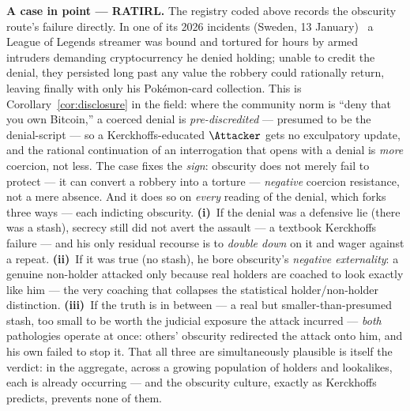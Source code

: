 \medskip\noindent\textbf{A case in point --- RATIRL.} The registry coded above records
the obscurity route's failure directly. In one of its 2026 incidents (Sweden, 13
January)~\cite{ratirl} a League of Legends streamer was bound and tortured for hours by
armed intruders demanding cryptocurrency he denied holding; unable to credit the
denial, they persisted long past any value the robbery could rationally return,
leaving finally with only his Pok\'emon-card collection. This is
Corollary~\ref{cor:disclosure} in the field: where the community norm is ``deny that
you own Bitcoin,'' a coerced denial is \emph{pre-discredited} --- presumed to be the
denial-script --- so a Kerckhoffs-educated $\Attacker$ gets no exculpatory update, and
the rational continuation of an interrogation that opens with a denial is \emph{more}
coercion, not less. The case fixes the
\emph{sign}: obscurity does not merely fail to protect --- it can convert a robbery
into a torture --- \emph{negative} coercion resistance, not a mere absence. And it does so on \emph{every}
reading of the denial, which forks three ways --- each indicting obscurity.
\textbf{(i)}~If the denial was a defensive lie (there was a stash), secrecy still did
not avert the assault --- a textbook Kerckhoffs failure --- and his only residual
recourse is to \emph{double down} on it and wager against a repeat. \textbf{(ii)}~If it
was true (no stash), he bore obscurity's \emph{negative externality}: a genuine
non-holder attacked only because real holders are coached to look exactly like him ---
the very coaching that collapses the statistical holder/non-holder distinction.
\textbf{(iii)}~If the truth is in between --- a real but smaller-than-presumed stash,
too small to be worth the judicial exposure the attack incurred --- \emph{both}
pathologies operate at once: others' obscurity redirected the attack onto him, and his
own failed to stop it. That all three are simultaneously plausible is itself the
verdict: in the aggregate, across a growing population of holders and lookalikes, each
is already occurring --- and the obscurity culture, exactly as Kerckhoffs predicts,
prevents none of them.
